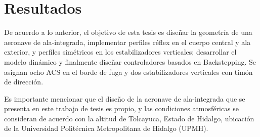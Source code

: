 


\section{Resultados}

De acuerdo a lo anterior, el objetivo de esta tesis es diseñar la geometría de una aeronave de ala-integrada, implementar perfiles réflex en el cuerpo central y ala exterior, y perfiles simétricos en los estabilizadores verticales; desarrollar el modelo dinámico y finalmente diseñar controladores basados en Backstepping. Se asignan ocho ACS en el borde de fuga y dos estabilizadores verticales con timón de dirección.

Es importante mencionar que el diseño de la aeronave de ala-integrada que se presenta en este trabajo de tesis es propio, y las condiciones atmosféricas se consideran de acuerdo con la altitud de Tolcayuca, Estado de Hidalgo, ubicación de la Universidad Politécnica Metropolitana de Hidalgo (UPMH).


